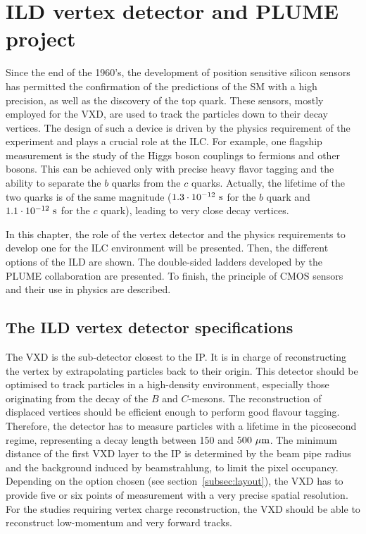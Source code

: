 \chapter{ILD vertex detector and PLUME project}
\label{chap:vxd}
  
  Since the end of the 1960's, the development of position sensitive silicon sensors has permitted the confirmation of the predictions of the \acrfull{SM} with a high precision, as well as the discovery of the top quark.
  These sensors, mostly employed for the \acrfull{VXD}, are used to track the particles down to their decay vertices.
  The design of such a device is driven by the physics requirement of the experiment and plays a crucial role at the \acrfull{ILC}.
  For example, one flagship measurement is the study of the Higgs boson couplings to fermions and other bosons.
  This can be achieved only with precise heavy flavor tagging and the ability to separate the $b$ quarks from the $c$ quarks. 
  Actually, the lifetime of the two quarks is of the same magnitude ($1.3 \cdot 10^{-12}~\rm{s}$ for the $b$ quark and $1.1 \cdot 10^{-12}~\rm{s}$ for the $c$ quark), leading to very close decay vertices. 
  
  In this chapter, the role of the vertex detector and the physics requirements to develop one for the \gls{ILC} environment will be presented.
  Then, the different options of the \acrfull{ILD} are shown.
  The double-sided ladders developed by the \gls{PLUME} collaboration are presented.
  To finish, the principle of \gls{CMOS} sensors and their use in physics are described.

  \minitoc
  
  \section{The ILD vertex detector specifications}
   
    The \gls{VXD} is the sub-detector closest to the \acrfull{IP}.
    It is in charge of reconstructing the vertex by extrapolating particles back to their origin. 
    This detector should be optimised to track particles in a high-density environment, especially those originating from the decay of the $B$ and $C$-mesons.
    The reconstruction of displaced vertices should be efficient enough to perform good flavour tagging.
    Therefore, the detector has to measure particles with a lifetime in the picosecond regime, representing a decay length between 150 and $500~\rm{\mu m}$.
    The minimum distance of the first \gls{VXD} layer to the \gls{IP} is determined by the beam pipe radius and the background induced by beamstrahlung, to limit the pixel occupancy.
    Depending on the option chosen (see section~\ref{subsec:layout}), the \gls{VXD} has to provide five or six points of measurement with a very precise spatial resolution.
    For the studies requiring vertex charge reconstruction, the \gls{VXD} should be able to reconstruct low-momentum and very forward tracks.

